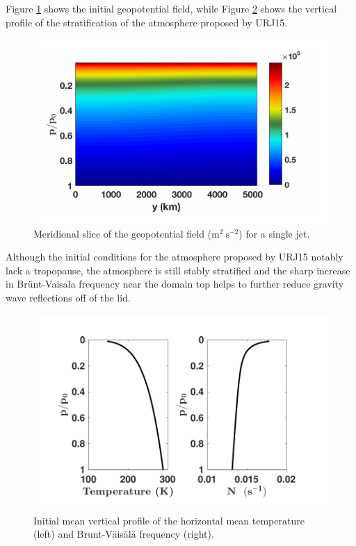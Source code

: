Figure \ref{fig:initialGeo} shows the initial geopotential field, while Figure \ref{fig:tempBuoy} shows the vertical profile of the stratification of the atmosphere proposed by URJ15. 

\begin{figure}[H]
\includegraphics[scale=1]{Chapter3/img/initialGeo}
\caption{Meridional slice of the geopotential field ($\text{m}^2~\text{s}^{-2}$) for a single jet.}
\label{fig:initialGeo}
\end{figure}

Although the initial conditions for the atmosphere proposed by URJ15 notably lack a tropopause, the atmosphere is still stably stratified and the sharp increase in Br{\"u}nt-Vaisala frequency near the domain top helps to further reduce gravity wave reflections off of the lid.

\begin{figure}[H]
\includegraphics[scale=1]{Chapter3/img/tempBuoy}
\caption{Initial mean vertical profile of the horizontal mean temperature (left) and Brunt-V\"ais\"al\"a frequency (right).}
\label{fig:tempBuoy}
\end{figure}



